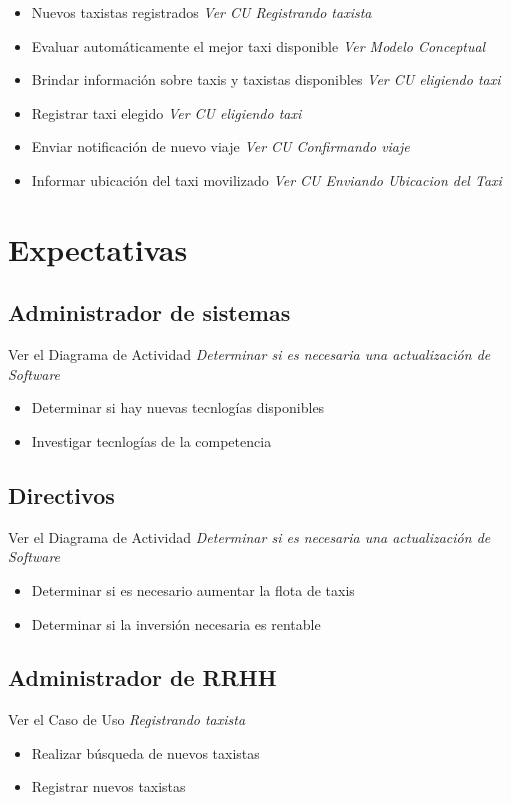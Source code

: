 \documentclass[a4paper]{article}
\begin{document}
\begin{itemize}
\item Nuevos taxistas registrados \textit{Ver CU Registrando taxista}
\item Evaluar autom\'aticamente el mejor taxi disponible \textit{Ver Modelo Conceptual}
\item Brindar informaci\'on sobre taxis y taxistas disponibles \textit{Ver CU eligiendo taxi}
\item Registrar taxi elegido \textit{Ver CU eligiendo taxi}
\item Enviar notificaci\'on de nuevo viaje \textit{Ver CU Confirmando viaje}
\item Informar ubicaci\'on del taxi movilizado \textit{Ver CU Enviando Ubicacion del Taxi}

\end{itemize}


\section{Expectativas}


\subsection{Administrador de sistemas}
Ver el Diagrama de Actividad \textit{Determinar si es necesaria una actualizaci\'on de Software}
\begin{itemize}
 \item Determinar si hay nuevas tecnlog\'ias disponibles
 \item Investigar tecnlog\'ias de la competencia

\end{itemize}



\subsection{Directivos}
Ver el Diagrama de Actividad \textit{Determinar si es necesaria una actualizaci\'on de Software}
\begin{itemize}
 \item Determinar si es necesario aumentar la flota de taxis
 \item Determinar si la inversi\'on necesaria es rentable
\end{itemize}

\subsection{Administrador de RRHH}
Ver el Caso de Uso \textit{Registrando taxista}
\begin{itemize}
 \item Realizar b\'usqueda de nuevos taxistas
 \item Registrar nuevos taxistas
\end{itemize}
\end{document}

